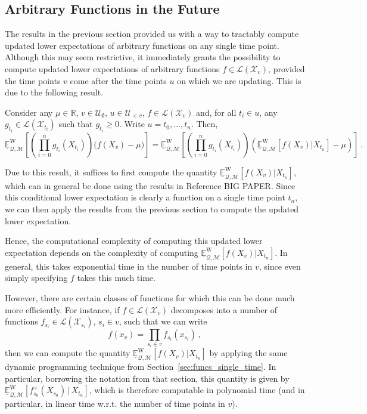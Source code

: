 \documentclass[twoside,11pt]{article}
\newcommand{\reals}{\mathbb{R}}
\newcommand{\states}{\mathcal{X}}
\newcommand{\lexp}{\underline{\mathbb{E}}_{\rateset,\mathcal{M}}^\mathrm{W}}
\newcommand{\gambles}{\mathcal{L}}
\newcommand{\rateset}{\mathcal{Q}}
\begin{document}
\subsection{Arbitrary Functions in the Future}

The results in the previous section provided us with a way to tractably compute updated lower expectations of arbitrary functions on any single time point. Although this may seem restrictive, it immediately grants the possibility to compute updated lower expectations of arbitrary functions $f\in\gambles(\states_v)$, provided the time points $v$ come after the time points $u$ on which we are updating. This is due to the following result.

\begin{proposition}\label{prop:arbitrary_future_functions}
Consider any $\mu\in\reals$, $v\in\mathcal{U}_\emptyset$, $u\in\mathcal{U}_{<v}$, $f\in\gambles(\states_v)$ and, for all $t_i\in u$, any $g_{t_i}\in\gambles(\states_{t_i})$ such that $g_{t_i}\geq 0$. Write $u=t_0,\ldots,t_n$. Then,
\begin{equation*}
\lexp\left[\left(\prod_{i=0}^n g_{t_i}(X_{t_i})\right)\bigl(f(X_v) - \mu\bigr)\right] = \lexp\left[\left(\prod_{i=0}^n g_{t_i}(X_{t_i})\right)\left(\lexp[f(X_v)\vert X_{t_n}] - \mu\right)\right]\,.
\end{equation*}
\end{proposition}
Due to this result, it suffices to first compute the quantity $\lexp[f(X_v)\vert X_{t_n}]$, which can in general be done using the results in Reference BIG PAPER. Since this conditional lower expectation is clearly a function on a single time point $t_n$, we can then apply the results from the previous section to compute the updated lower expectation.

Hence, the computational complexity of computing this updated lower expectation depends on the complexity of computing $\lexp[f(X_v)\vert X_{t_n}]$. In general, this takes exponential time in the number of time points in $v$, since even simply specifying $f$ takes this much time.

However, there are certain classes of functions for which this can be done much more efficiently. For instance, if $f\in\gambles(\states_v)$ decomposes into a number of functions $f_{s_i}\in\gambles(\states_{s_i})$, $s_i\in v$, such that we can write
\begin{equation*}
f(x_v) = \prod_{s_i\in v}f_{s_i}(x_{s_i})\,,
\end{equation*}
then we can compute the quantity $\lexp[f(X_v)\vert X_{t_n}]$ by applying the same dynamic programming technique from Section~\ref{sec:funcs_single_time}. In particular, borrowing the notation from that section, this quantity is given by $\lexp[f_{s_0}^+(X_{s_0})\,\vert\,X_{t_n}]$, which is therefore computable in polynomial time (and in particular, in linear time w.r.t. the number of time points in $v$).
\end{document}
